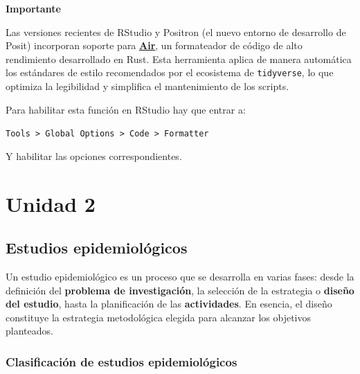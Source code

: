 \documentclass[
  spanish,
  a4paper,
]{scrbook}
\begin{document}
\begin{tcolorbox}[enhanced jigsaw, arc=.35mm, bottomrule=.15mm, breakable, colback=white, colframe=quarto-callout-warning-color-frame, left=2mm, leftrule=.75mm, opacityback=0, rightrule=.15mm, toprule=.15mm]
\begin{minipage}[t]{5.5mm}
\textcolor{quarto-callout-warning-color}{\faExclamationTriangle}
\end{minipage}%
\begin{minipage}[t]{\textwidth - 5.5mm}

\vspace{-3mm}\textbf{Importante}\vspace{3mm}

Las versiones recientes de RStudio y Positron (el nuevo entorno de
desarrollo de Posit) incorporan soporte para
\href{https://posit-dev.github.io/air/}{\textbf{Air}}, un formateador de
código de alto rendimiento desarrollado en Rust. Esta herramienta aplica
de manera automática los estándares de estilo recomendados por el
ecosistema de \texttt{tidyverse}, lo que optimiza la legibilidad y
simplifica el mantenimiento de los scripts.

Para habilitar esta función en RStudio hay que entrar a:

\texttt{Tools\ \textgreater{}\ Global\ Options\ \textgreater{}\ Code\ \textgreater{}\ Formatter}

Y habilitar las opciones correspondientes.

\end{minipage}%
\end{tcolorbox}

\part{Unidad 2}

\chapter{Estudios epidemiológicos}\label{estudios-epidemioluxf3gicos}

Un estudio epidemiológico es un proceso que se desarrolla en varias
fases: desde la definición del \textbf{problema de investigación}, la
selección de la estrategia o \textbf{diseño del estudio}, hasta la
planificación de las \textbf{actividades}. En esencia, el diseño
constituye la estrategia metodológica elegida para alcanzar los
objetivos planteados.

\section{Clasificación de estudios
epidemiológicos}\label{clasificaciuxf3n-de-estudios-epidemioluxf3gicos}
\end{document}
